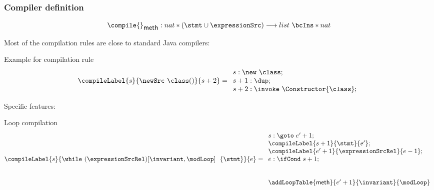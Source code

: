 \documentclass{beamer}
\begin{document}
   
    \begin{frame}\frametitle{Compiler definition}

      {\small $$  \compile{ }_{\methodd} : nat * (\stmt \cup \expressionSrc ) \longrightarrow  list \ \bcIns * nat  $$}

      Most of the compilation rules are close to standard Java compilers:
      \begin{block}{Example for compilation rule}
     {\tiny $$  \begin{array}{l} \compileLabel{s}{ \newSrc \ \class  ( ) }{s+2}  = 
                 \begin{array}{l}
                       s :    \new \ \class; \\ 
		       s + 1: \dup; \\
		       s + 2 : \invoke \ \Constructor{\class};     
	       \end{array} \end{array} $$}
      \end{block}

      Specific features:
      \begin{block}{Loop compilation}
       {\tiny  $$\compileLabel{s}{\while \ (\expressionSrcRel) \lbrack \invariant, \modLoop \rbrack \ \do \ \{ \stmt \} }{e} = 
         \begin{array}{l}
              s: \goto \ e' + 1; \\
	      \compileLabel{s +  1}{\stmt}{e' }; \\
	      \compileLabel{e' +  1}{\expressionSrcRel}{e  -1 };\\
	      e: \ifCond \ s +  1; \\
	      \\\\
	      \addLoopTable{\methodd}{e'+1}{\invariant }{\modLoop}
	 \end{array} $$}
      \end{block}
\end{frame}
\end{document}
